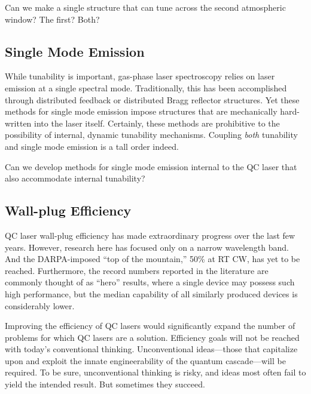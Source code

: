 \medskip

\noindent
{} \quad  Can we make a single structure that can tune across the second atmospheric window?  The first?  Both?

\subsection{Single Mode Emission}

While tunability is important, gas-phase laser spectroscopy relies on laser emission at a single spectral mode.  Traditionally, this has been accomplished through distributed feedback \cite{Gmachl:APL:1998:DFB} or distributed Bragg reflector \cite{Hvozdara:APL:2000:DBR} structures.  Yet these methods for single mode emission impose structures that are mechanically hard-written into the laser itself.  Certainly, these methods are prohibitive to the possibility of internal, dynamic tunability mechanisms.  Coupling \emph{both} tunability and single mode emission is a tall order indeed.

\medskip

\noindent
{} \quad  Can we develop methods for single mode emission internal to the QC laser that also accommodate internal tunability?


\subsection{Wall-plug Efficiency}

QC laser wall-plug efficiency has made extraordinary progress over the last few years.  However, research here has focused only on a narrow wavelength band.  And the DARPA-imposed ``top of the mountain,'' 50\% at RT CW, has yet to be reached.  Furthermore, the record numbers reported in the literature are commonly thought of as ``hero'' results, where a single device may possess such high performance, but the median capability of all similarly produced devices is considerably lower.

Improving the efficiency of QC lasers would significantly expand the number of problems for which QC lasers are a solution.  Efficiency goals will not be reached with today's conventional thinking.  Unconventional ideas---those that capitalize upon and exploit the innate engineerability of the quantum cascade---will be required.  To be sure, unconventional thinking is risky, and ideas most often fail to yield the intended result.  But sometimes they succeed.

